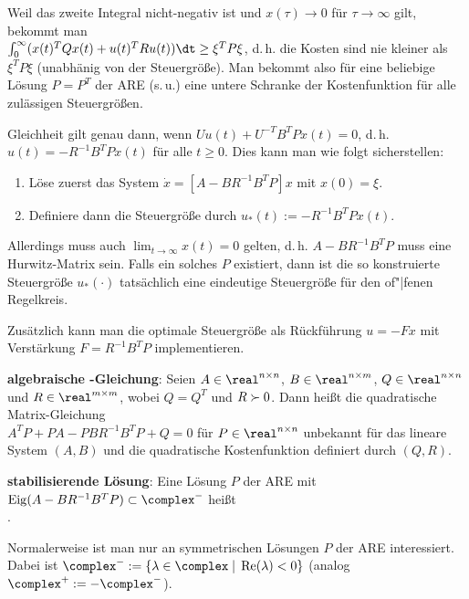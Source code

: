 Weil das zweite Integral nicht-negativ ist und $x(\tau) \to 0$ für $\tau \to \infty$ gilt,
bekommt man\\
$\int_0^\infty (x(t)^T Qx(t) + u(t)^T Ru(t)) \dt \ge \xi^T P\xi$,
d.\,h. die Kosten sind nie kleiner als $\xi^T P\xi$ (unabhänig von der Steuergröße).
Man bekommt also für eine beliebige Lösung $P = P^T$ der ARE (s.\,u.) eine untere Schranke der
Kostenfunktion für alle zulässigen Steuergrößen.

Gleichheit gilt genau dann,
wenn $Uu(t) + U^{-T} B^T P x(t) = 0$, d.\,h.
$u(t) = -R^{-1} B^T Px(t)$ für alle $t \ge 0$.
Dies kann man wie folgt sicherstellen:
\begin{enumerate}
    \item
    Löse zuerst das System $\dot{x} = [A - BR^{-1} B^T P]x$ mit $x(0) = \xi$.
    
    \item
    Definiere dann die Steuergröße durch $u_\ast(t) := -R^{-1} B^T P x(t)$.
\end{enumerate}
Allerdings muss auch $\lim_{t \to \infty} x(t) = 0$ gelten, d.\,h. $A - BR^{-1} B^T P$ muss
eine Hurwitz-Matrix sein.
Falls ein solches $P$ existiert, dann ist die so konstruierte Steuergröße $u_\ast(\cdot)$
tatsächlich eine eindeutige Steuergröße für den of"|fenen Regelkreis.

Zusätzlich kann man die optimale Steuergröße als Rückführung $u = -Fx$ mit Verstärkung
$F = R^{-1} B^T P$ implementieren.

\linie

\textbf{algebraische -Gleichung}:
Seien $A \in \real^{n \times n}$, $B \in \real^{n \times m}$,
$Q \in \real^{n \times n}$ und $R \in \real^{m \times m}$,
wobei $Q = Q^T$ und $R \succ 0$.
Dann heißt die quadratische Matrix-Gleichung\\
$A^T P + PA - PBR^{-1} B^T P + Q = 0$
für $P \in \real^{n \times n}$ unbekannt 
für das lineare System $(A, B)$ und die quadratische Kostenfunktion definiert durch $(Q, R)$.

\textbf{stabilisierende Lösung}:
Eine Lösung $P$ der ARE mit $\Eig(A - BR^{-1} B^T P) \subset \complex^-$ heißt\\
.

Normalerweise ist man nur an symmetrischen Lösungen $P$ der ARE interessiert.\\
Dabei ist $\complex^- := \{\lambda \in \complex \;|\; \Re(\lambda) < 0\}$
(analog $\complex^+ := -\complex^-$).

